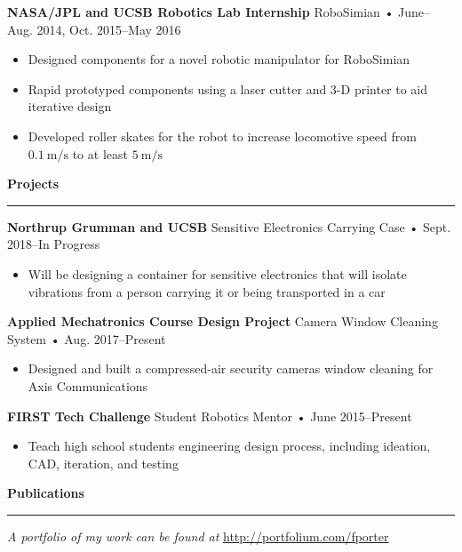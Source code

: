 \documentclass[12pt, oneside]{article}
\newcommand{\headingstyleJobs}[1] {
	{\fontsize{20pt}{1em}\selectfont \bf \textcolor{new_red}{#1}}
	\textcolor{new_red}{\rule{3.25in}{0.5pt}} \vspace{3pt}
}
\newcommand{\jobtitle}[3] {
	{\bf #1} {#2} • {#3} \vspace{-10pt} \\
}
\begin{document}
\begin{flushleft}
\jobtitle{NASA/JPL and UCSB Robotics Lab Internship}{RoboSimian}{June–Aug. 2014, Oct. 2015–May 2016}
\begin{itemize}
	\item Designed components for a novel robotic manipulator for RoboSimian
	\item Rapid prototyped components using a laser cutter and 3-D printer to aid iterative design
	\item Developed roller skates for the robot to increase locomotive speed from $\SI{0.1}{\meter\per\second}$ to at least $\SI{5}{\meter\per\second}$
\end{itemize}


\headingstyleJobs{Projects}

\jobtitle{Northrup Grumman and UCSB}{Sensitive Electronics Carrying Case}{Sept. 2018–In Progress}
\begin{itemize}
	\item Will be designing a container for sensitive electronics that will isolate vibrations from a person carrying it or being transported in a car
\end{itemize}

\jobtitle{Applied Mechatronics Course Design Project}{Camera Window Cleaning System}{Aug. 2017–Present}
\begin{itemize}
	\item Designed and built a compressed-air security cameras window cleaning for Axis Communications 
\end{itemize}

\jobtitle{FIRST Tech Challenge}{Student Robotics Mentor}{June 2015–Present}
\begin{itemize}
	\item Teach high school students engineering design process, including ideation, CAD, iteration, and testing
\end{itemize}




\headingstyleJobs{Publications}

\vspace{-9pt}
\nocite{OWMS-DSA}




\textit{A portfolio of my work can be found at} \url{http://portfolium.com/fporter}

\end{flushleft}
\end{document}
